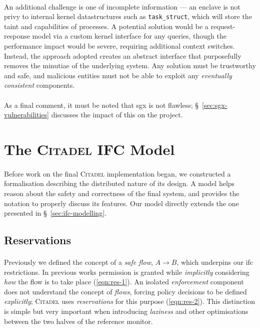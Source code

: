 \paragraph{} An additional challenge is one of incomplete information --- an enclave is not privy to internal kernel datastructures such as \texttt{task\_struct}, which will store the taint and capabilities of processes. A potential solution would be a request-response model via a custom kernel interface for any queries, though the performance impact would be severe, requiring additional context switches. Instead, the approach adopted creates an abstract interface that purposefully removes the minutiae of the underlying system. Any solution must be trustworthy and safe, and malicious entities must not be able to exploit any \textit{eventually consistent} components.~\cite{10.1145/1435417.1435432}

\paragraph{} As a final comment, it must be noted that \acrshort{sgx} is not flawless; §~\ref{sec:sgx-vulnerabilities} discusses the impact of this on the project.


\clearpage
\section{The \textsc{Citadel} IFC Model}

\paragraph{} Before work on the final \textsc{Citadel} implementation began, we constructed a formalisation describing the distributed nature of its design. A model helps reason about the safety and correctness of the final system, and provides the notation to properly discuss its features. Our model directly extends the one presented in §~\ref{sec:ifc-modelling}.

\subsection{Reservations}

\paragraph{} Previously we defined the concept of a \textit{safe flow}, $A \rightarrow B$, which underpins our \acrshort{ifc} restrictions. In previous works permission is granted while \textit{implicitly} considering \textit{how} the flow is to take place (\ref{eqn:res-1}). An isolated \textit{enforcement} component does not understand the concept of \textit{flows}, forcing policy decisions to be defined \textit{explicitly}; \textsc{Citadel} uses \textit{reservations} for this purpose (\ref{eqn:res-2}). This distinction is simple but very important when introducing \textit{laziness} and other optimisations between the two halves of the reference monitor.

